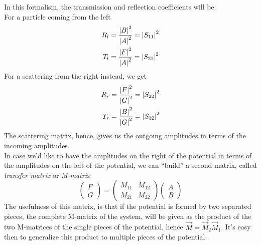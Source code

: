 \documentclass[../qm.tex]{subfiles}
\begin{document}
	In this formalism, the transmission and reflection coefficients will be:\\
	For a particle coming from the left
	\begin{equation}
		\begin{aligned}
			R_l&=\frac{\abs{B}^2}{\abs{A}^2}=\abs{S_{11}}^2\\
			T_l&=\frac{\abs{F}^2}{\abs{A}^2}=\abs{S_{21}}^2
		\end{aligned}
		\label{eq:scatteringleftsm}
	\end{equation}
	For a scattering from the right instead, we get
	\begin{equation}
		\begin{aligned}
			R_r&=\frac{\abs{F}^2}{\abs{G}^2}=\abs{S_{22}}^2\\
			T_r&=\frac{\abs{B}^2}{\abs{G}^2}=\abs{S_{12}}^2
		\end{aligned}
		\label{eq:scatteringrightsm}
	\end{equation}
	The scattering matrix, hence, gives us the outgoing amplitudes in terms of the incoming amplitudes.\\
	In case we'd like to have the amplitudes on the right of the potential in terms of the amplitudes on the left of the potential, we can ``build'' a second matrix, called \textit{transfer matrix} or \textit{M-matrix}
	\begin{equation}
		\begin{pmatrix}
			F\\
			G
		\end{pmatrix}=\begin{pmatrix}
			M_{11}&M_{12}\\
			M_{21}&M_{22}
		\end{pmatrix}\begin{pmatrix}
			A\\
			B
		\end{pmatrix}
		\label{eq:mmatrix}
	\end{equation}
	The usefulness of this matrix, is that if the potential is formed by two separated pieces, the complete M-matrix of the system, will be given as the product of the two M-matrices of the single pieces of the potential, hence $\vec{M}=\vec{M}_2\vec{M}_1$. It's easy then to generalize this product to multiple pieces of the potential.
\end{document}
